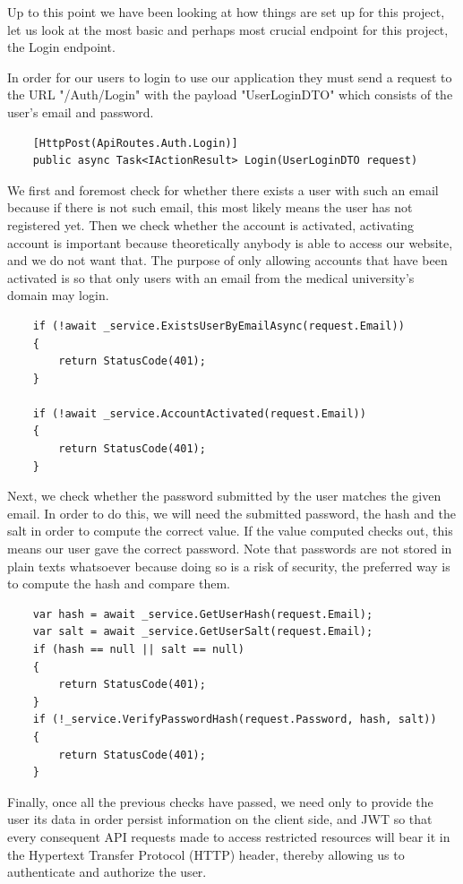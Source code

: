 \documentclass[singlespacing,12pt,parskip,headsepline,consistentlayout]{article}
\begin{document}
Up to this point we have been looking at how things are set up for this project, let us look at the most basic and perhaps most crucial endpoint for this project, the Login endpoint.

In order for our users to login to use our application they must send a request to the URL "/Auth/Login" with the payload "UserLoginDTO" which consists of the user's email and password.

\begin{lstlisting}
    [HttpPost(ApiRoutes.Auth.Login)]
    public async Task<IActionResult> Login(UserLoginDTO request)
\end{lstlisting}

We first and foremost check for whether there exists a user with such an email because if there is not such email, this most likely means the user has not registered yet. Then we check whether the account is activated, activating account is important because theoretically anybody is able to access our website, and we do not want that. The purpose of only allowing accounts that have been activated is so that only users with an email from the medical university's domain may login.

\begin{lstlisting}
    if (!await _service.ExistsUserByEmailAsync(request.Email))
    {
        return StatusCode(401);
    }

    if (!await _service.AccountActivated(request.Email))
    {
        return StatusCode(401);
    }
\end{lstlisting}

Next, we check whether the password submitted by the user matches the given email. In order to do this, we will need the submitted password, the hash and the salt in order to compute the correct value. If the value computed checks out, this means our user gave the correct password. Note that passwords are not stored in plain texts whatsoever because doing so is a risk of security, the preferred way is to compute the hash and compare them.

\begin{lstlisting}
    var hash = await _service.GetUserHash(request.Email);
    var salt = await _service.GetUserSalt(request.Email);
    if (hash == null || salt == null)
    {
        return StatusCode(401);
    }
    if (!_service.VerifyPasswordHash(request.Password, hash, salt))
    {
        return StatusCode(401);
    }
\end{lstlisting}

Finally, once all the previous checks have passed, we need only to provide the user its data in order persist information on the client side, and JWT so that every consequent API requests made to access restricted resources will bear it in the Hypertext Transfer Protocol (HTTP) header, thereby allowing us to authenticate and authorize the user.
\end{document}
